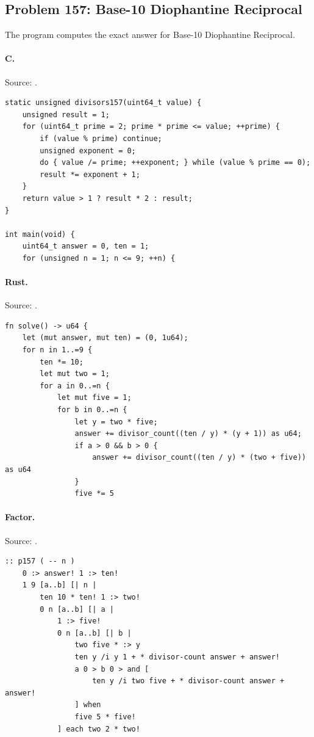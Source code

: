 \subsection{Problem 157: Base-10 Diophantine Reciprocal}
\label{walkthrough:p157}
The program computes the exact answer for Base-10 Diophantine Reciprocal.

\paragraph{C.} Source: .
\begin{lstlisting}
static unsigned divisors157(uint64_t value) {
    unsigned result = 1;
    for (uint64_t prime = 2; prime * prime <= value; ++prime) {
        if (value % prime) continue;
        unsigned exponent = 0;
        do { value /= prime; ++exponent; } while (value % prime == 0);
        result *= exponent + 1;
    }
    return value > 1 ? result * 2 : result;
}

int main(void) {
    uint64_t answer = 0, ten = 1;
    for (unsigned n = 1; n <= 9; ++n) {
\end{lstlisting}

\paragraph{Rust.} Source: .
\begin{lstlisting}
fn solve() -> u64 {
    let (mut answer, mut ten) = (0, 1u64);
    for n in 1..=9 {
        ten *= 10;
        let mut two = 1;
        for a in 0..=n {
            let mut five = 1;
            for b in 0..=n {
                let y = two * five;
                answer += divisor_count((ten / y) * (y + 1)) as u64;
                if a > 0 && b > 0 {
                    answer += divisor_count((ten / y) * (two + five)) as u64
                }
                five *= 5
\end{lstlisting}

\paragraph{Factor.} Source: .
\begin{lstlisting}
:: p157 ( -- n )
    0 :> answer! 1 :> ten!
    1 9 [a..b] [| n |
        ten 10 * ten! 1 :> two!
        0 n [a..b] [| a |
            1 :> five!
            0 n [a..b] [| b |
                two five * :> y
                ten y /i y 1 + * divisor-count answer + answer!
                a 0 > b 0 > and [
                    ten y /i two five + * divisor-count answer + answer!
                ] when
                five 5 * five!
            ] each two 2 * two!
\end{lstlisting}

